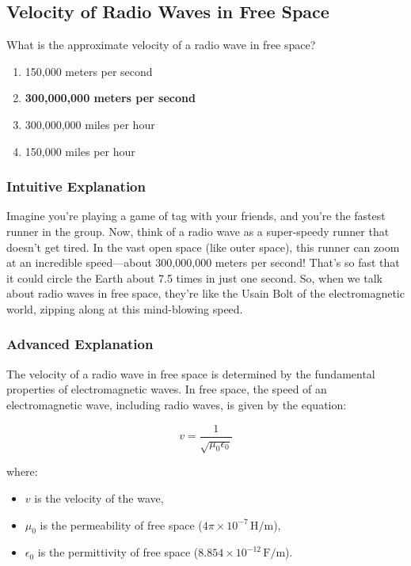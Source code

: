 \subsection{Velocity of Radio Waves in Free Space}
\label{T3B11}

\begin{tcolorbox}[colback=gray!10!white,colframe=black!75!black,title=T3B11]
What is the approximate velocity of a radio wave in free space?
\begin{enumerate}[label=\Alph*)]
    \item 150,000 meters per second
    \item \textbf{300,000,000 meters per second}
    \item 300,000,000 miles per hour
    \item 150,000 miles per hour
\end{enumerate}
\end{tcolorbox}

\subsubsection{Intuitive Explanation}
Imagine you’re playing a game of tag with your friends, and you’re the fastest runner in the group. Now, think of a radio wave as a super-speedy runner that doesn’t get tired. In the vast open space (like outer space), this runner can zoom at an incredible speed—about 300,000,000 meters per second! That’s so fast that it could circle the Earth about 7.5 times in just one second. So, when we talk about radio waves in free space, they’re like the Usain Bolt of the electromagnetic world, zipping along at this mind-blowing speed.

\subsubsection{Advanced Explanation}
The velocity of a radio wave in free space is determined by the fundamental properties of electromagnetic waves. In free space, the speed of an electromagnetic wave, including radio waves, is given by the equation:

\[
v = \frac{1}{\sqrt{\mu_0 \epsilon_0}}
\]

where:
\begin{itemize}
    \item \( v \) is the velocity of the wave,
    \item \( \mu_0 \) is the permeability of free space (\( 4\pi \times 10^{-7} \, \text{H/m} \)),
    \item \( \epsilon_0 \) is the permittivity of free space (\( 8.854 \times 10^{-12} \, \text{F/m} \)).
\end{itemize}

